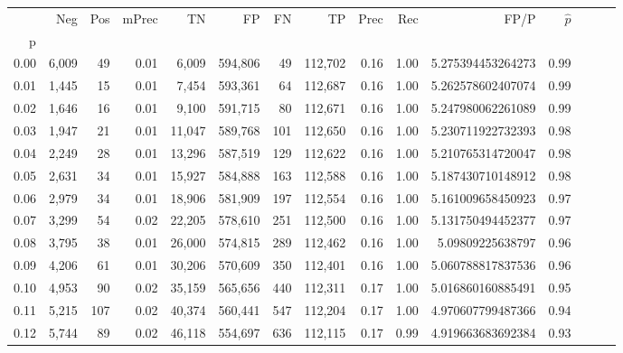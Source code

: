 \begin{tabular}{rrrrrrrrrrrrrrr}
\toprule
{} &     Neg &    Pos & mPrec &       TN &       FP &       FN &       TP &  Prec &   Rec &                   FP/P & $\hat{p}$ \\
p    &         &        &       &          &          &          &          &       &       &                        &           \\
\midrule
0.00 &   6,009 &     49 &  0.01 &    6,009 &  594,806 &       49 &  112,702 &  0.16 &  1.00 &      5.275394453264273 &      0.99 \\
0.01 &   1,445 &     15 &  0.01 &    7,454 &  593,361 &       64 &  112,687 &  0.16 &  1.00 &      5.262578602407074 &      0.99 \\
0.02 &   1,646 &     16 &  0.01 &    9,100 &  591,715 &       80 &  112,671 &  0.16 &  1.00 &      5.247980062261089 &      0.99 \\
0.03 &   1,947 &     21 &  0.01 &   11,047 &  589,768 &      101 &  112,650 &  0.16 &  1.00 &      5.230711922732393 &      0.98 \\
0.04 &   2,249 &     28 &  0.01 &   13,296 &  587,519 &      129 &  112,622 &  0.16 &  1.00 &      5.210765314720047 &      0.98 \\
0.05 &   2,631 &     34 &  0.01 &   15,927 &  584,888 &      163 &  112,588 &  0.16 &  1.00 &      5.187430710148912 &      0.98 \\
0.06 &   2,979 &     34 &  0.01 &   18,906 &  581,909 &      197 &  112,554 &  0.16 &  1.00 &      5.161009658450923 &      0.97 \\
0.07 &   3,299 &     54 &  0.02 &   22,205 &  578,610 &      251 &  112,500 &  0.16 &  1.00 &      5.131750494452377 &      0.97 \\
0.08 &   3,795 &     38 &  0.01 &   26,000 &  574,815 &      289 &  112,462 &  0.16 &  1.00 &       5.09809225638797 &      0.96 \\
0.09 &   4,206 &     61 &  0.01 &   30,206 &  570,609 &      350 &  112,401 &  0.16 &  1.00 &      5.060788817837536 &      0.96 \\
0.10 &   4,953 &     90 &  0.02 &   35,159 &  565,656 &      440 &  112,311 &  0.17 &  1.00 &      5.016860160885491 &      0.95 \\
0.11 &   5,215 &    107 &  0.02 &   40,374 &  560,441 &      547 &  112,204 &  0.17 &  1.00 &      4.970607799487366 &      0.94 \\
0.12 &   5,744 &     89 &  0.02 &   46,118 &  554,697 &      636 &  112,115 &  0.17 &  0.99 &      4.919663683692384 &      0.93 \\

\end{tabular}
